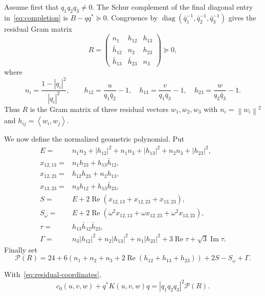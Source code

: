 \documentclass[10pt,twoside]{siamart1116}
\newcommand{\diag}{\operatorname{diag}}
\newcommand{\Rea}{\operatorname{Re}}
\newcommand{\Ima}{\operatorname{Im}}
\newcommand{\ip}[2]{\left\langle #1,#2\right\rangle}
\newcommand{\norm}[1]{\left\lVert #1\right\rVert}
\newcommand{\mat}[1]{\begin{pmatrix}#1\end{pmatrix}}
\newcommand{\psd}{\succeq 0}
\begin{document}
Assume first that $q_1q_2q_3\neq0$.  The Schur complement of the final
diagonal entry in~\eqref{eq:completion} is
$B-qq^*\psd$.  Congruence by
$\diag(\bar q_1^{-1},\bar q_2^{-1},\bar q_3^{-1})$ gives the residual Gram
matrix
\begin{equation}\label{eq:residual-gram}
 R=\mat{
 n_1&h_{12}&h_{13}\\
 \bar h_{12}&n_2&h_{23}\\
 \bar h_{13}&\bar h_{23}&n_3
 }\psd,
\end{equation}
where
\begin{equation}\label{eq:residual-coordinates}
 n_i=\frac{1-|q_i|^2}{|q_i|^2},\qquad
 h_{12}=\frac{u}{q_1\bar q_2}-1,\quad
 h_{13}=\frac{v}{q_1\bar q_3}-1,\quad
 h_{23}=\frac{w}{q_2\bar q_3}-1.
\end{equation}
Thus $R$ is the Gram matrix of three residual vectors $w_1,w_2,w_3$ with
$n_i=\norm{w_i}^2$ and $h_{ij}=\ip{w_i}{w_j}$.

We now define the normalized geometric polynomial.  Put
\begin{align}
 E={}&n_1n_2+|h_{12}|^2+n_1n_3+|h_{13}|^2+n_2n_3+|h_{23}|^2,\nonumber\\
 x_{12,13}={}&n_1h_{23}+h_{13}\bar h_{12},\nonumber\\
 x_{12,23}={}&h_{12}h_{23}+n_2h_{13},\nonumber\\
 x_{13,23}={}&n_3h_{12}+h_{13}\bar h_{23},\nonumber\\
 S={}&E+2\Rea(x_{12,13}+x_{12,23}+x_{13,23}),\label{eq:tensor-terms}\\
 S_\omega={}&E+2\Rea(\omega^2x_{12,13}+\omega x_{12,23}
                     +\omega^2x_{13,23}),\nonumber\\
 \tau={}&h_{13}\bar h_{12}\bar h_{23},\nonumber\\
 \Gamma={}&n_3|h_{12}|^2+n_2|h_{13}|^2+n_1|h_{23}|^2
              +3\Rea\tau+\sqrt3\Ima\tau.\nonumber
\end{align}
Finally set
\begin{equation}\label{eq:geometric-P}
 \mathcal P(R)=24+6\left(n_1+n_2+n_3
 +2\Rea(h_{12}+h_{13}+h_{23})\right)+2S-S_\omega+\Gamma.
\end{equation}

\begin{lemma}\label{lem:normalization-identity}
With~\eqref{eq:residual-coordinates},
\begin{equation}\label{eq:normalization-identity}
 c_0(u,v,w)+q^*K(u,v,w)q
 =|q_1q_2q_3|^2\mathcal P(R).
\end{equation}
\end{lemma}
\end{document}
